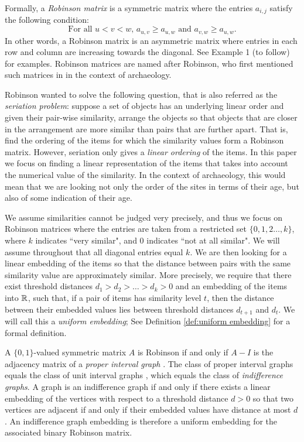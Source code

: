 \documentclass[runningheads]{llncs}
\begin{document}
Formally, a {\em Robinson matrix} is a symmetric matrix where the entries $a_{i,j}$ satisfy the following condition:
\begin{equation}\label{robinson:intro}
\text{For all $u<v<w$, } a_{u,v}\geq a_{u,w}\text{ and }a_{v,w}\geq a_{u,w}.
\end{equation}
In other words, a Robinson matrix is an asymmetric matrix where entries in each row and column are increasing towards the diagonal. See Example 1 (to follow) for examples.
Robinson matrices are named after Robinson, who first mentioned such matrices in \cite{robinson} in the context of archaeology. 

Robinson wanted to solve the following question, that is also referred as the {\em seriation problem}: suppose a set of objects has an underlying linear order and given their pair-wise similarity, arrange the objects so that objects that are closer in the arrangement are more similar than pairs that are further apart. That is,
 find the ordering of the items for which the similarity values form a Robinson matrix. However, seriation only gives a {\sl linear ordering} of the items. In this paper we focus on finding a linear representation of the items that takes into account the numerical value of the similarity. In the context of archaeology, this would mean that we are looking not only the order of the sites in terms of their age, but also of some indication of their age. 

We assume similarities cannot be judged very precisely, and thus we focus on Robinson matrices where the entries are taken from a restricted set $
\{ 0,1,2\dots, k\}$, where $k$ indicates ``very similar", and 0 indicates ``not at all similar". We will assume throughout that all diagonal entries equal $k$. We are then looking for a linear embedding of the items so that the distance between pairs with the same similarity value are approximately similar.  More precisely, we require that there exist threshold distances $d_1>d_2>\dots >d_k>0$ and an embedding of the items into $\mathbb R$, such that, if  a pair of items has similarity level $t$, then the distance between their embedded values lies between threshold distances $d_{t+1}$ and $d_t$. We will call this a \emph{uniform embedding}; See Definition \ref{def:uniform embedding} for a formal definition.

A $\{ 0,1\}$-valued symmetric matrix $A$ is Robinson if and only if $A-I$ is the adjacency matrix of a \emph{proper interval graph} \cite{kendall1969incidence}. 
The class of proper interval graphs equals the class of unit interval graphs
 \cite{roberts1969indifference}, which equals the class of \emph{indifference graphs}. A graph is an indifference graph if and only if there exists a linear embedding of the vertices with respect to a threshold distance $d>0$ so that two vertices are adjacent if and only if their embedded values have distance at most $d$. An indifference graph embedding is therefore a uniform embedding for the associated binary Robinson matrix.
\end{document}
